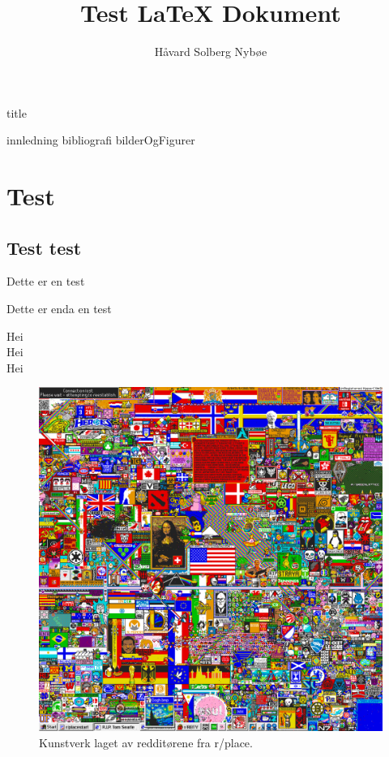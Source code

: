 \documentclass[a4paper, 12pt]{article}
\title{Test {\LaTeX} Dokument}
\author{Håvard Solberg Nybøe}
\begin{document}

{title}
\newpage

\tableofcontents
\listoffigures
\listoftables
\newpage


{innledning}
{bibliografi}
{bilderOgFigurer}

\section{Test}
    \subsection{Test test}
    Dette er en test

    Dette er enda en test

    Hei \parencite{druckmann2020}\\
    Hei \parencite{druckmann2013}\\
    Hei \parencite{druckmann2014}

    \begin{figure}[h]\label{r/place}
        \centering
        \includegraphics[width=.6\textwidth]{img/r_place.png}
        \caption{Kunstverk laget av redditørene fra r/place.}
    \end{figure}

\newpage
\printbibliography[heading=bibintoc]
\end{document}
